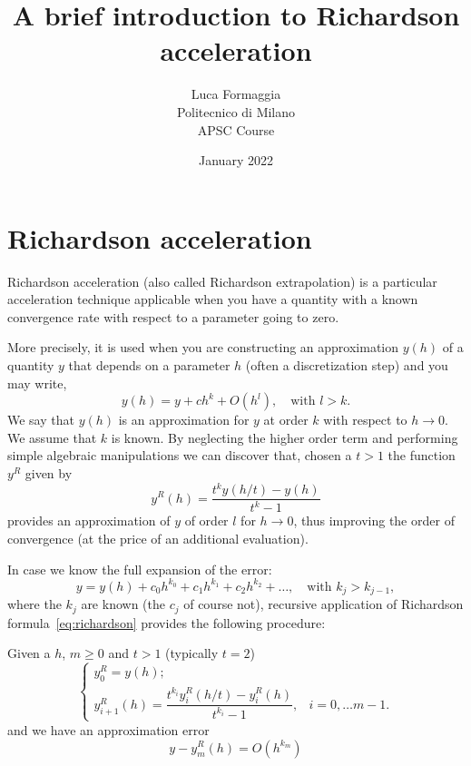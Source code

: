 \documentclass[10pt,a4paper,twoside]{article}
\title{A brief introduction to Richardson acceleration}
\author{Luca Formaggia\\Politecnico di Milano\\ APSC Course}
\date{January 2022}
\begin{document}
\maketitle
    \section{Richardson acceleration}

    Richardson acceleration (also called Richardson extrapolation) is a particular acceleration technique
    applicable when you have a quantity with a known convergence rate
    with respect to a parameter going to zero.
    
    More precisely, it is used when you are constructing an approximation
    $y(h)$ of a quantity $y$ that depends on a parameter $h$
    (often a discretization step) and you may write, 
    \begin{equation}
    y(h) = y + ch^k +O(h^{l}),\quad \text{with } l>k.
    \end{equation} 
    We say that $y(h)$ is an approximation for $y$ at order $k$ with respect to $h\to 0$. We assume that $k$ is known. By neglecting the higher order term and performing simple algebraic manipulations
    we can discover that, chosen a $t>1$  the function $y^R$ given by
    \begin{equation}\label{eq:richardson}
    y^R(h)=\frac{t^ky(h/t)-y(h)}{t^k-1}
    \end{equation} 
    provides an approximation of $y$ of order $l$ for $h\to 0$, thus improving the order of convergence (at the price of an additional evaluation).
    
    In case we know the full expansion of the error:
      \begin{equation}\label{eq:expansion}
   y = y(h) + c_0h^{k_0} + c_1h^{k_1} +c_2h^{k_2} + \ldots,\quad \text{with } k_j>k_{j-1},
   \end{equation} 
   where the $k_j$ are known (the $c_j$ of course not), recursive application of Richardson formula~\eqref{eq:richardson} provides the following procedure:

   Given a $h$, $m\ge 0$ and $t>1$ (typically $t=2$)
    \begin{equation}\label{eq:Richbase}
    \begin{cases}
    y^R_0=y(h);\\
    y^R_{i+1}(h)=\dfrac{t^{k_i}y^R_i(h/t)-y^R_i(h)}{t^{k_i}-1},& i=0,\ldots m-1.
    \end{cases}
  \end{equation}
    and we have an approximation error
    \begin{equation}
    y-y^R_m(h)=O(h^{k_m})
    \end{equation}
  
\end{document}
